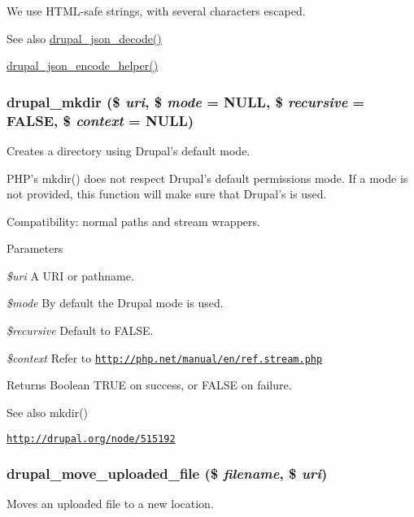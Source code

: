 We use HTML-\/safe strings, with several characters escaped.

\begin{DoxySeeAlso}{See also}
\hyperlink{group__php__wrappers_gae065f2a8115ef999b74d765c8e7f35ff}{drupal\_\-json\_\-decode()} 

\hyperlink{json-encode_8inc_a96f15d8dc7b543c3f7568ed07f592ff3}{drupal\_\-json\_\-encode\_\-helper()} 
\end{DoxySeeAlso}
\hypertarget{group__php__wrappers_ga0cd03adb94eea525f87fb061c9a33340}{
\subsubsection[{drupal\_\-mkdir}]{\setlength{\rightskip}{0pt plus 5cm}drupal\_\-mkdir (\$ {\em uri}, \/  \$ {\em mode} = {\ttfamily NULL}, \/  \$ {\em recursive} = {\ttfamily FALSE}, \/  \$ {\em context} = {\ttfamily NULL})}}
\label{group__php__wrappers_ga0cd03adb94eea525f87fb061c9a33340}
Creates a directory using Drupal's default mode.

PHP's mkdir() does not respect Drupal's default permissions mode. If a mode is not provided, this function will make sure that Drupal's is used.

Compatibility: normal paths and stream wrappers.


\begin{DoxyParams}{Parameters}
\item[{\em \$uri}]A URI or pathname. \item[{\em \$mode}]By default the Drupal mode is used. \item[{\em \$recursive}]Default to FALSE. \item[{\em \$context}]Refer to \href{http://php.net/manual/en/ref.stream.php}{\tt http://php.net/manual/en/ref.stream.php}\end{DoxyParams}
\begin{DoxyReturn}{Returns}
Boolean TRUE on success, or FALSE on failure.
\end{DoxyReturn}
\begin{DoxySeeAlso}{See also}
mkdir() 

\href{http://drupal.org/node/515192}{\tt http://drupal.org/node/515192} 
\end{DoxySeeAlso}
\hypertarget{group__php__wrappers_gad2a800badd2c93efbff2a2905507e685}{
\subsubsection[{drupal\_\-move\_\-uploaded\_\-file}]{\setlength{\rightskip}{0pt plus 5cm}drupal\_\-move\_\-uploaded\_\-file (\$ {\em filename}, \/  \$ {\em uri})}}
\label{group__php__wrappers_gad2a800badd2c93efbff2a2905507e685}
Moves an uploaded file to a new location.

